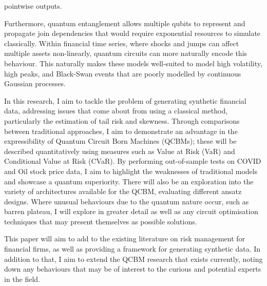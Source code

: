\documentclass[12pt]{article}
\newcommand{\newp}
    {
    \vskip 0.5cm 
  }
\numberwithin{equation}{section}
\begin{document}
pointwise outputs. 
\newp
Furthermore, quantum entanglement allows multiple qubits to represent and propagate 
join dependencies that would require exponential resources to simulate classically. 
Within financial time series, where shocks and jumps can affect multiple assets 
non-linearly, quantum circuits can more naturally encode this behaviour. This 
naturally makes these models well-suited to model high volatility, high peaks, 
and Black-Swan events that are poorly modelled by continuous Gaussian processes. 
\newp 
In this research, I aim to tackle the problem 
of generating synthetic financial data, addressing issues that come about from 
using a classical method, particularly the estimation of tail risk and skewness. 
Through comparisons between traditional approaches, 
I aim to demonstrate an advantage in the expressibility of Quantum Circuit Born 
Machines (QCBMs); these will be described quantitatively using measures such as 
Value at Risk (VaR) and Conditional Value at Risk (CVaR). By performing out-of-sample 
tests on COVID and Oil stock price data, I aim to highlight the weaknesses of traditional models 
and showcase a quantum superiority.
There will also be an exploration into the variety of architectures 
available for the QCBM, evaluating different ansatz designs. Where unusual behaviours
due to the quantum nature occur, such as barren plateau, I will explore in greater detail 
as well as any circuit optimisation techniques that may present themselves as 
possible solutions. 
\newp
This paper will aim to add to the existing literature on risk management for 
financial firms, as well as providing a framework for generating synthetic 
data. In addition to that, I aim to extend the QCBM research that exists 
currently, noting down any behaviours that may be of interest to the curious 
and potential experts in the field.
\newpage
\end{document}
